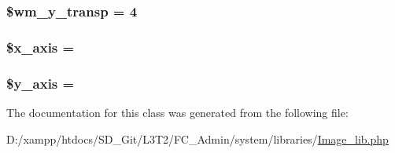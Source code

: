 \subsubsection[{\$wm\+\_\+y\+\_\+transp}]{\setlength{\rightskip}{0pt plus 5cm}\$wm\+\_\+y\+\_\+transp = 4}\label{class_c_i___image__lib_aa9ab81b196739723a7c38d9431c9fa11}
\hypertarget{class_c_i___image__lib_a128914b11765a500690f876962196ca6}{}
\subsubsection[{\$x\+\_\+axis}]{\setlength{\rightskip}{0pt plus 5cm}\$x\+\_\+axis = \textquotesingle{}\textquotesingle{}}\label{class_c_i___image__lib_a128914b11765a500690f876962196ca6}
\hypertarget{class_c_i___image__lib_ac60512307da37068c0821f7dc2488608}{}
\subsubsection[{\$y\+\_\+axis}]{\setlength{\rightskip}{0pt plus 5cm}\$y\+\_\+axis = \textquotesingle{}\textquotesingle{}}\label{class_c_i___image__lib_ac60512307da37068c0821f7dc2488608}


The documentation for this class was generated from the following file\+:\begin{DoxyCompactItemize}
\item 
D\+:/xampp/htdocs/\+S\+D\+\_\+\+Git/\+L3\+T2/\+F\+C\+\_\+\+Admin/system/libraries/\hyperlink{_image__lib_8php}{Image\+\_\+lib.\+php}\end{DoxyCompactItemize}
